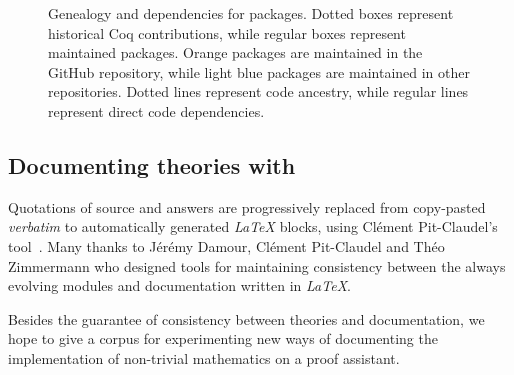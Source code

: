 \documentclass[twoside,a4paper]{book}
\begin{document}
\begin{figure}[ht]
{
}
\caption{Genealogy and dependencies for \Hydras packages. Dotted boxes represent historical Coq contributions, while regular boxes represent maintained \coq packages. Orange packages are maintained in the \Hydras GitHub repository, while light blue packages are maintained in other \community repositories. Dotted lines represent \coq code ancestry, while regular lines represent direct code dependencies.}
  \label{fig:genealogy}
\end{figure}

 

 
 
\subsection{Documenting theories with \alectr}

Quotations of \coq source and answers are progressively replaced from copy-pasted \emph{verbatim} to automatically generated \emph{LaTeX} blocks, using Clément Pit-Claudel's \alectr  tool~\cite{alectryonpaper, alectryongithub}.
Many thanks to Jérémy Damour, Clément Pit-Claudel  and Théo Zimmermann who designed tools for maintaining consistency between the always evolving \coq{} modules and documentation written in \emph{LaTeX}.

Besides the guarantee of consistency between theories and documentation, we hope to give a corpus for experimenting new ways of documenting the implementation of non-trivial mathematics on a proof assistant.
\end{document}
